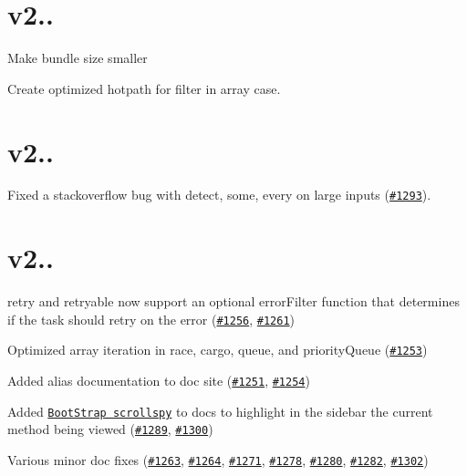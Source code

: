 \section*{v2..}


\begin{DoxyItemize}
\item Make bundle size smaller
\item Create optimized hotpath for {\ttfamily filter} in array case.
\end{DoxyItemize}

\section*{v2..}


\begin{DoxyItemize}
\item Fixed a stackoverflow bug with {\ttfamily detect}, {\ttfamily some}, {\ttfamily every} on large inputs (\href{https://github.com/caolan/async/issues/1293}{\tt \#1293}).
\end{DoxyItemize}

\section*{v2..}


\begin{DoxyItemize}
\item {\ttfamily retry} and {\ttfamily retryable} now support an optional {\ttfamily error\+Filter} function that determines if the {\ttfamily task} should retry on the error (\href{https://github.com/caolan/async/issues/1256}{\tt \#1256}, \href{https://github.com/caolan/async/issues/1261}{\tt \#1261})
\item Optimized array iteration in {\ttfamily race}, {\ttfamily cargo}, {\ttfamily queue}, and {\ttfamily priority\+Queue} (\href{https://github.com/caolan/async/issues/1253}{\tt \#1253})
\item Added alias documentation to doc site (\href{https://github.com/caolan/async/issues/1251}{\tt \#1251}, \href{https://github.com/caolan/async/issues/1254}{\tt \#1254})
\item Added \href{http://getbootstrap.com/javascript/#scrollspy}{\tt Boot\+Strap scrollspy} to docs to highlight in the sidebar the current method being viewed (\href{https://github.com/caolan/async/issues/1289}{\tt \#1289}, \href{https://github.com/caolan/async/issues/1300}{\tt \#1300})
\item Various minor doc fixes (\href{https://github.com/caolan/async/issues/1263}{\tt \#1263}, \href{https://github.com/caolan/async/issues/1264}{\tt \#1264}, \href{https://github.com/caolan/async/issues/1271}{\tt \#1271}, \href{https://github.com/caolan/async/issues/1278}{\tt \#1278}, \href{https://github.com/caolan/async/issues/1280}{\tt \#1280}, \href{https://github.com/caolan/async/issues/1282}{\tt \#1282}, \href{https://github.com/caolan/async/issues/1302}{\tt \#1302})
\end{DoxyItemize}


